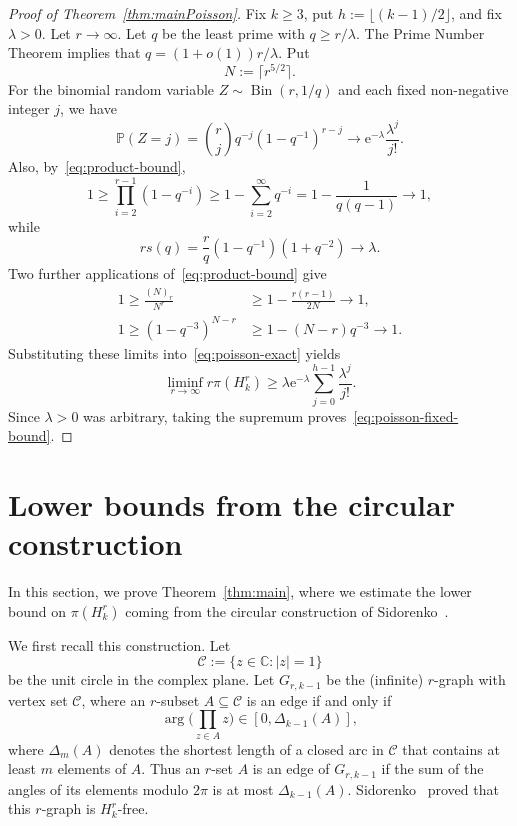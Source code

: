 \documentclass[10pt,a4paper]{article}
\numberwithin{equation}{section}
\theoremstyle{definition}
\theoremstyle{remark}
\newcommand{\me}{\mathrm{e}}
\renewcommand{\longrightarrow}{\to}
\begin{document}
\begin{proof}[Proof of Theorem~\ref{thm:mainPoisson}]
	Fix $k\ge3$, put $h:=\lfloor(k-1)/2\rfloor$, and fix $\lambda>0$. Let $r\to\infty$.  Let $q$ be the least prime with $q\ge r/\lambda$. The Prime Number Theorem implies that $q=(1+o(1)) r/\lambda$. Put
	\[
	N:=\lceil r^{5/2}\rceil.
	\]
	For the binomial random variable $Z\sim\operatorname{Bin}(r,1/q)$ and each fixed non-negative integer $j$, we have
	\[
	\mathbb P(Z=j)=\binom rj q^{-j}(1-q^{-1})^{r-j}
	\longrightarrow\me^{-\lambda}\frac{\lambda^j}{j!}.
	\]
	Also, by~\eqref{eq:product-bound},
	\[
	1\ge\prod_{i=2}^{r-1}(1-q^{-i})
	\ge1-\sum_{i=2}^{\infty}q^{-i}
	=1-\frac1{q(q-1)}\longrightarrow1,
	\]
	while
	\[
	rs(q)=\frac rq(1-q^{-1})(1+q^{-2})\longrightarrow\lambda.
	\]
	Two further applications of~\eqref{eq:product-bound} give
	\begin{align*}
		1\ge\frac{(N)_r}{N^r}
		&\ge1-\frac{r(r-1)}{2N}\longrightarrow1,\\
		1\ge(1-q^{-3})^{N-r}
		&\ge1-(N-r)q^{-3}\longrightarrow1.
	\end{align*}
	Substituting these limits into~\eqref{eq:poisson-exact} yields
	\[
	\liminf_{r\to\infty}r\pi(H_k^r)
	\ge\lambda\me^{-\lambda}\sum_{j=0}^{h-1}\frac{\lambda^j}{j!}.
	\]
	Since $\lambda>0$ was arbitrary, taking the supremum proves~\eqref{eq:poisson-fixed-bound}.
\end{proof}


\section{Lower bounds
from the circular construction}\label{sec:3}


In this section, we prove Theorem~\ref{thm:main}, where we estimate the lower bound on $\pi(H_k^r)$ coming from  the circular construction of Sidorenko~\cite{Sidorenko24}. 

We first recall this construction.
Let 
\[
\mathcal C:=\{z\in\mathbb C: |z|=1\}
\]
be the unit circle in the complex plane. Let $G_{r,k-1}$ be the (infinite) $r$-graph with vertex set $\mathcal C$, where an $r$-subset $A\subseteq \mathcal C$ is an edge if and only if 
\[\arg\Big(\prod_{z\in A}z \Big)\in\left[0, \Delta_{k-1}(A)\right],
\]
where $\Delta_{m}(A)$ denotes the shortest length of a closed arc in $\mathcal C$ that contains at least $m$ elements of $A$. Thus an $r$-set $A$ is an edge of $G_{r,k-1}$ if the sum of the angles of its elements modulo $2\pi$ is at most $\Delta_{k-1}(A)$.
Sidorenko~\cite[Theorem 3.1]{Sidorenko24} proved that this $r$-graph is $H_k^r$-free. 
\end{document}
